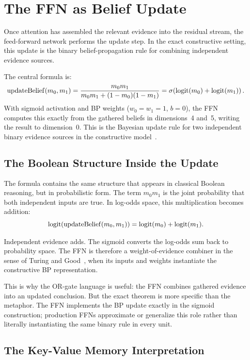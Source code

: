\section{The FFN as Belief Update}
\label{sec:ffn-or}

Once attention has assembled the relevant evidence into the residual
stream, the feed-forward network performs the update step. In the exact
constructive setting, this update is the binary belief-propagation rule
for combining independent evidence sources.

The central formula is:
\[
\mathrm{updateBelief}(m_0, m_1)
  = \frac{m_0 m_1}{m_0 m_1 + (1-m_0)(1-m_1)}
  = \sigma\!\left(\operatorname{logit}(m_0) + \operatorname{logit}(m_1)\right).
\]
With sigmoid activation and BP weights ($w_0 = w_1 = 1$, $b = 0$), the
FFN computes this exactly from the gathered beliefs in dimensions~4
and~5, writing the result to dimension~0. This is the Bayesian update
rule for two independent binary evidence sources in the constructive
model~\cite{coppola2026transformers}.

\subsection*{The Boolean Structure Inside the Update}

The formula contains the same structure that appears in classical
Boolean reasoning, but in probabilistic form. The term $m_0 m_1$ is the
joint probability that both independent inputs are true. In log-odds
space, this multiplication becomes addition:
\[
\operatorname{logit}(\mathrm{updateBelief}(m_0, m_1)) = \operatorname{logit}(m_0) + \operatorname{logit}(m_1).
\]

Independent evidence adds. The sigmoid converts the log-odds sum back to
probability space. The FFN is therefore a weight-of-evidence combiner in
the sense of Turing and Good~\cite{good1950probability}, when its inputs
and weights instantiate the constructive BP representation.

This is why the OR-gate language is useful: the FFN combines gathered
evidence into an updated conclusion. But the exact theorem is more
specific than the metaphor. The FFN implements the BP update exactly in
the sigmoid construction; production FFNs approximate or generalize this
role rather than literally instantiating the same binary rule in every
unit.

\subsection*{The Key-Value Memory Interpretation}

